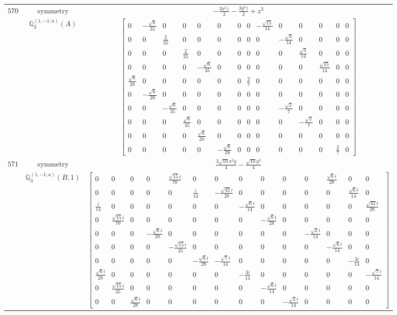 \documentclass[fleqn,8pt,landscape]{jsarticle}
\begin{document}
\begin{longtable}{ccc}
$ 570 $ & $ \text{symmetry} $ & $ - \frac{3 x^{2} z}{2} - \frac{3 y^{2} z}{2} + z^{3} $ \\
$  $ & $ \mathbb{Q}_{3}^{(1,-1;a)}(A) $ & $ \begin{bmatrix} 0 & - \frac{\sqrt{6}}{35} & 0 & 0 & 0 & 0 & 0 & 0 & - \frac{\sqrt{15}}{14} & 0 & 0 & 0 & 0 & 0 \\ 0 & 0 & \frac{2}{35} & 0 & 0 & 0 & 0 & 0 & 0 & - \frac{\sqrt{3}}{14} & 0 & 0 & 0 & 0 \\ 0 & 0 & 0 & \frac{2}{35} & 0 & 0 & 0 & 0 & 0 & 0 & \frac{\sqrt{3}}{14} & 0 & 0 & 0 \\ 0 & 0 & 0 & 0 & - \frac{\sqrt{6}}{35} & 0 & 0 & 0 & 0 & 0 & 0 & \frac{\sqrt{15}}{14} & 0 & 0 \\ \frac{\sqrt{6}}{28} & 0 & 0 & 0 & 0 & 0 & 0 & \frac{2}{7} & 0 & 0 & 0 & 0 & 0 & 0 \\ 0 & - \frac{\sqrt{6}}{20} & 0 & 0 & 0 & 0 & 0 & 0 & 0 & 0 & 0 & 0 & 0 & 0 \\ 0 & 0 & - \frac{\sqrt{6}}{35} & 0 & 0 & 0 & 0 & 0 & 0 & - \frac{\sqrt{2}}{7} & 0 & 0 & 0 & 0 \\ 0 & 0 & 0 & \frac{\sqrt{6}}{35} & 0 & 0 & 0 & 0 & 0 & 0 & - \frac{\sqrt{2}}{7} & 0 & 0 & 0 \\ 0 & 0 & 0 & 0 & \frac{\sqrt{6}}{20} & 0 & 0 & 0 & 0 & 0 & 0 & 0 & 0 & 0 \\ 0 & 0 & 0 & 0 & 0 & - \frac{\sqrt{6}}{28} & 0 & 0 & 0 & 0 & 0 & 0 & \frac{2}{7} & 0 \end{bmatrix} $ \\ \hline
$ 571 $ & $ \text{symmetry} $ & $ \frac{3 \sqrt{10} x^{2} y}{4} - \frac{\sqrt{10} y^{3}}{4} $ \\
$  $ & $ \mathbb{Q}_{3}^{(1,-1;a)}(B,1) $ & $ \begin{bmatrix} 0 & 0 & 0 & 0 & \frac{\sqrt{15} i}{70} & 0 & 0 & 0 & 0 & 0 & 0 & \frac{\sqrt{6} i}{28} & 0 & 0 \\ 0 & 0 & 0 & 0 & 0 & \frac{i}{14} & - \frac{\sqrt{42} i}{28} & 0 & 0 & 0 & 0 & 0 & \frac{\sqrt{6} i}{14} & 0 \\ \frac{i}{14} & 0 & 0 & 0 & 0 & 0 & 0 & - \frac{\sqrt{6} i}{14} & 0 & 0 & 0 & 0 & 0 & \frac{\sqrt{42} i}{28} \\ 0 & \frac{\sqrt{15} i}{70} & 0 & 0 & 0 & 0 & 0 & 0 & - \frac{\sqrt{6} i}{28} & 0 & 0 & 0 & 0 & 0 \\ 0 & 0 & 0 & - \frac{\sqrt{6} i}{28} & 0 & 0 & 0 & 0 & 0 & 0 & - \frac{\sqrt{2} i}{14} & 0 & 0 & 0 \\ 0 & 0 & 0 & 0 & - \frac{\sqrt{15} i}{35} & 0 & 0 & 0 & 0 & 0 & 0 & - \frac{\sqrt{6} i}{14} & 0 & 0 \\ 0 & 0 & 0 & 0 & 0 & - \frac{\sqrt{6} i}{28} & - \frac{\sqrt{7} i}{14} & 0 & 0 & 0 & 0 & 0 & - \frac{3 i}{14} & 0 \\ \frac{\sqrt{6} i}{28} & 0 & 0 & 0 & 0 & 0 & 0 & - \frac{3 i}{14} & 0 & 0 & 0 & 0 & 0 & - \frac{\sqrt{7} i}{14} \\ 0 & \frac{\sqrt{15} i}{35} & 0 & 0 & 0 & 0 & 0 & 0 & - \frac{\sqrt{6} i}{14} & 0 & 0 & 0 & 0 & 0 \\ 0 & 0 & \frac{\sqrt{6} i}{28} & 0 & 0 & 0 & 0 & 0 & 0 & - \frac{\sqrt{2} i}{14} & 0 & 0 & 0 & 0 \end{bmatrix} $ \\ \hline

\end{longtable}
\end{document}
